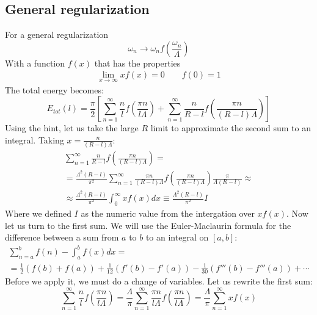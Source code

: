 \documentclass{article}
\begin{document}
\subsection{General regularization}
For a general regularization
\begin{equation}
    \omega_n \rightarrow \omega_n f\left(\frac{\omega_n}{\Lambda}\right)
\end{equation}
With a function $f(x)$ that has the properties
\begin{eqnarray}
    \lim_{x\rightarrow\infty} xf(x) = 0 \qquad f(0) = 1
\end{eqnarray}
The total energy becomes:
\begin{equation}
    E_{tot}(l) = \frac{\pi}{2}\left[
        \sum_{n=1}^\infty
        \frac{n}{l}f\left(\frac{\pi n}{l \Lambda}\right) +
        \sum_{n=1}^\infty
        \frac{n}{R - l}f\left(\frac{\pi n}{(R - l) \Lambda}\right)
    \right]
\end{equation}
Using the hint, let us take the large $R$ limit to approximate the second sum to an integral. Taking $x = \frac{n}{(R - l)\Lambda}$:
\begin{equation}
\begin{gathered}
    \sum_{n=1}^\infty \frac{n}{R - l}f\left(\frac{\pi n}{(R - l) \Lambda}\right) = \\ =
    \frac{\Lambda^2(R - l)}{\pi^2}\sum_{n=1}^\infty \frac{\pi n}{(R - l)\Lambda}f\left(\frac{\pi n}{(R - l) \Lambda}\right) \frac{\pi}{\Lambda(R - l)} \approx \\ \approx
    \frac{\Lambda^2(R - l)}{\pi^2}\int_{0}^\infty xf\left(x\right) dx \equiv \frac{\Lambda^2(R - l)}{\pi^2} I
\end{gathered}
\end{equation}
Where we defined $I$ as the numeric value from the intergation over $xf(x)$. Now let us turn to the first sum. We will use the Euler-Maclaurin formula for the difference between a sum from $a$ to $b$ to an integral on $[a, b]$:
\begin{equation}
\begin{gathered}
    \sum_{n=a}^{b} f(n) - \int_{a}^{b}f(x)dx = \\ =
    \frac{1}{2}\left(f(b) + f(a)\right) + 
    \frac{1}{12}\left(f'(b) - f'(a)\right) - 
    \frac{1}{30}\left(f'''(b) - f'''(a)\right) + \cdots
\end{gathered}
\end{equation}
Before we apply it, we must do a change of variables. Let us rewrite the first sum:
\begin{equation}
    \sum_{n=1}^\infty \frac{n}{l}f\left(\frac{\pi n}{l \Lambda}\right) =
    \frac{\Lambda}{\pi}\sum_{n=1}^\infty \frac{\pi n}{l\Lambda}f\left(\frac{\pi n}{l \Lambda}\right) = 
    \frac{\Lambda}{\pi}\sum_{n=1}^\infty x f\left(x\right)
\end{equation}
\end{document}

